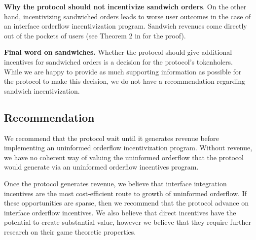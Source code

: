    \textbf{Why the protocol should not incentivize sandwich orders}.
    On the other hand, incentivizing sandwiched orders leads to worse user outcomes in the case of an interface orderflow incentivization program. Sandwich revenues come directly out of the pockets of users (see Theorem 2 in \cite{heimbach2022eliminating} for the proof).

    \textbf{Final word on sandwiches.}
    Whether the protocol should give additional incentives for sandwiched orders is a decision for the protocol's tokenholers. While we are happy to provide as much supporting information as possible for the protocol to make this decision, we do not have a recommendation regarding sandwich incentivization.

\subsection{Recommendation}
    We recommend that the protocol wait until it generates revenue before implementing an uninformed orderflow incentivization program. Without revenue, we have no coherent way of valuing the uninformed orderflow that the protocol would generate via an uninformed orderflow incentives program.

    Once the protocol generates revenue, we believe that interface integration incentives are the most cost-efficient route to growth of uninformed orderflow. If these opportunities are sparse, then we recommend that the protocol advance on interface orderflow incentives. We also believe that direct incentives have the potential to create substantial value, however we believe that they require further research on their game theoretic properties.
